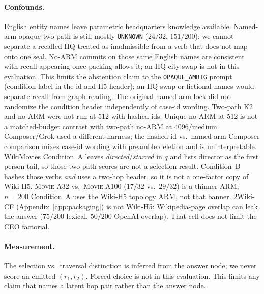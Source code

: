 \documentclass[10pt]{article} %
\begin{document}
\paragraph{Confounds.}
English entity names leave parametric headquarters knowledge available.
Named-arm opaque two-path is still mostly \texttt{UNKNOWN}
($24/32$, $151/200$); we cannot separate a recalled HQ treated as
inadmissible from a verb that does not map onto one seal.
No-ARM commits on those same English names are consistent with recall
appearing once packing allows it; an HQ-city swap is not in this
evaluation.
This limits the abstention claim to the \texttt{OPAQUE\_AMBIG} prompt
(condition label in the id and H5 header); an HQ swap or
fictional names would separate recall from graph reading.
The original named-arm lock did not randomize the condition header
independently of case-id wording.
Two-path K2 and no-ARM were not run at 512 with hashed ids.
Unique no-ARM at 512 is not a matched-budget contrast with two-path
no-ARM at 4096/medium.
Composer/Grok used a different harness; the hashed-id vs.\ named-arm
Composer comparison mixes case-id wording with preamble deletion and is
uninterpretable.
WikiMovies Condition~A leaves \emph{directed}/\emph{starred} in $q$ and
lists director as the first person-tail, so those two-path scores are not
a selection result.
Condition~B hashes those verbs \emph{and} uses a two-hop header, so it is
not a one-factor copy of Wiki-H5.
\textsc{Movie-A32} vs.\ \textsc{Movie-A100} ($17/32$ vs.\ $29/32$) is a
thinner ARM; $n{=}200$ Condition~A uses the Wiki-H5 topology ARM, not
that banner.
2Wiki-CF (Appendix~\ref{app:packaging}) is not Wiki-H5: Wikipedia-page
overlap can leak the answer ($75/200$ lexical, $50/200$ OpenAI overlap).
That cell does not limit the CEO factorial.

\paragraph{Measurement.}
The selection vs.\ traversal distinction is inferred from the answer node;
we never score an emitted $(r_1,r_2)$.
Forced-choice is not in this evaluation.
This limits any claim that names a latent hop pair rather than the
answer node.
\end{document}
